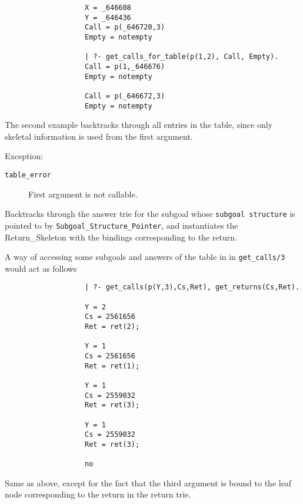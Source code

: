 \begin{description}
{\begin{verbatim}
                   X = _646608
                   Y = _646436
                   Call = p(_646720,3)
                   Empty = notempty

                   | ?- get_calls_for_table(p(1,2), Call, Empty).
                   Call = p(1,_646676)
                   Empty = notempty

                   Call = p(_646672,3)
                   Empty = notempty
     \end{verbatim}
     }
The second example backtracks through all entries in the table, since
only skeletal information is used from the first argument.

Exception:
    \begin{description}
    \item[{\tt table\_error}]
	First argument is not callable.
    \end{description}


Backtracks through the answer trie for the subgoal whose {\tt subgoal structure}
is pointed to by {\tt Subgoal\_Structure\_Pointer}, and instantiates the 
{Return\_Skeleton} with the bindings corresponding to the return.


A way of accessing some subgoals and answers of the table in
in {\tt get\_calls/3}  would act as follows
    {\footnotesize
     \begin{verbatim}
                   | ?- get_calls(p(Y,3),Cs,Ret), get_returns(Cs,Ret).

                   Y = 2
                   Cs = 2561656
                   Ret = ret(2);

                   Y = 1
                   Cs = 2561656
                   Ret = ret(1);

                   Y = 1
                   Cs = 2559032
                   Ret = ret(3);

                   Y = 1
                   Cs = 2559032
                   Ret = ret(3);

                   no

     \end{verbatim}
     }


Same as above, except for the fact that the third argument is bound
to the leaf node corresponding to the return in the return trie.




\end{description}
